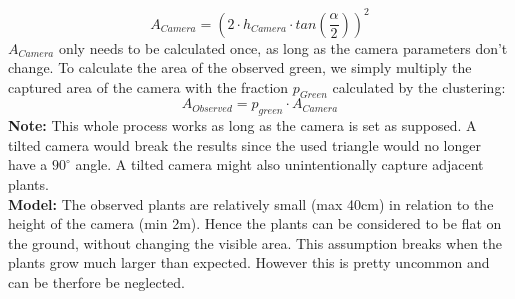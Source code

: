 $$A_{Camera} = (2\cdot h_{Camera}\cdot tan(\frac{\alpha}{2}))^2$$
$A_{Camera}$ only needs to be calculated once, as long as the camera parameters don't change. To calculate the area of the observed green, we simply multiply the captured area of the camera with the fraction $p_{Green}$ calculated by the clustering: 
$$A_{Observed} = p_{green}\cdot A_{Camera}$$
\textbf{Note:} This whole process works as long as the camera is set as supposed. A tilted camera would break the results since the used triangle would no longer have a $90^{\circ}$ angle. A tilted camera might also unintentionally capture adjacent plants.\\
\textbf{Model:} The observed plants are relatively small (max 40cm) in relation to the height of the camera (min 2m). Hence the plants can be considered to be flat on the ground, without changing the visible area. This assumption breaks when the plants grow much larger than expected. However this is pretty uncommon and can be therfore be neglected.
